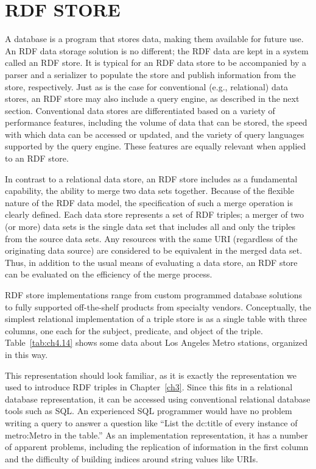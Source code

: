 \section{RDF STORE}

A database is a program that stores data, making them available for
future use. An RDF data storage solution is no different; the RDF data
are kept in a system called an RDF store. It is typical for an RDF data
store to be accompanied by a parser and a serializer to populate the
store and publish information from the store, respectively. Just as is
the case for conventional (e.g., relational) data stores, an RDF store
may also include a query engine, as described in the next section.
Conventional data stores are differentiated based on a variety of
performance features, including the volume of data that can be stored,
the speed with which data can be accessed or updated, and the variety of
query languages supported by the query engine. These features are
equally relevant when applied to an RDF store.

In contrast to a relational data store, an RDF store includes as a
fundamental capability, the ability to merge two data sets together.
Because of the flexible nature of the RDF data model, the specification
of such a merge operation is clearly defined. Each data store represents
a set of RDF triples; a merger of two (or more) data sets is the single
data set that includes all and only the triples from the source data
sets. Any resources with the same URI (regardless of the originating
data source) are considered to be equivalent in the merged data set.
Thus, in addition to the usual means of evaluating a data store, an RDF
store can be evaluated on the efficiency of the merge process.

RDF store implementations range from custom programmed database
solutions to fully supported off-the-shelf products from specialty
vendors. Conceptually, the simplest relational implementation of a
triple store is as a single table with three columns, one each for the
subject, predicate, and object of the triple. Table~\ref{tab:ch4.14} shows some data
about Los Angeles Metro stations, organized in this way.

This representation should look familiar, as it is exactly the
representation we used to introduce
RDF triples in Chapter~\ref{ch3}. Since this fits in a relational database
representation, it can be accessed using conventional relational
database tools such as SQL. An experienced SQL programmer would have no
problem writing a query to answer a question like ``List the dc:title of
every instance of metro:Metro in the table.'' As an implementation
representation, it has a number of apparent problems, including the replication of information in the first column
and the difficulty of building indices around string values like URIs.

